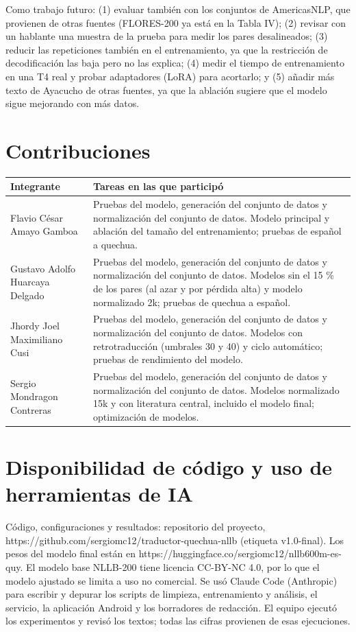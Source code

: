 \documentclass[conference]{IEEEtran}
\begin{document}
Como trabajo futuro: (1) evaluar también con los conjuntos de AmericasNLP, que provienen de otras fuentes (FLORES-200 ya está en la Tabla IV); (2) revisar con un hablante una muestra de la prueba para medir los pares desalineados; (3) reducir las repeticiones también en el entrenamiento, ya que la restricción de decodificación las baja pero no las explica; (4) medir el tiempo de entrenamiento en una T4 real y probar adaptadores (LoRA) para acortarlo; y (5) añadir más texto de Ayacucho de otras fuentes, ya que la ablación sugiere que el modelo sigue mejorando con más datos.

\section*{Contribuciones}
\begin{tabular}{@{}p{}p{}@{}}
\toprule
Integrante & Tareas en las que participó \\
\midrule
Flavio César Amayo Gamboa & Pruebas del modelo, generación del conjunto de datos y normalización del conjunto de datos. Modelo principal y ablación del tamaño del entrenamiento; pruebas de español a quechua. \\
Gustavo Adolfo Huarcaya Delgado & Pruebas del modelo, generación del conjunto de datos y normalización del conjunto de datos. Modelos sin el 15 \% de los pares (al azar y por pérdida alta) y modelo normalizado 2k; pruebas de quechua a español. \\
Jhordy Joel Maximiliano Cusi & Pruebas del modelo, generación del conjunto de datos y normalización del conjunto de datos. Modelos con retrotraducción (umbrales 30 y 40) y ciclo automático; pruebas de rendimiento del modelo. \\
Sergio Mondragon Contreras & Pruebas del modelo, generación del conjunto de datos y normalización del conjunto de datos. Modelos normalizado 15k y con literatura central, incluido el modelo final; optimización de modelos. \\
\bottomrule
\end{tabular}

\section*{Disponibilidad de código y uso de herramientas de IA}
Código, configuraciones y resultados: repositorio del proyecto, https://github.com/sergiomc12/traductor-quechua-nllb (etiqueta v1.0-final). Los pesos del modelo final están en https://huggingface.co/sergiomc12/nllb600m-es-quy. El modelo base NLLB-200 tiene licencia CC-BY-NC 4.0, por lo que el modelo ajustado se limita a uso no comercial. Se usó Claude Code (Anthropic) para escribir y depurar los scripts de limpieza, entrenamiento y análisis, el servicio, la aplicación Android y los borradores de redacción. El equipo ejecutó los experimentos y revisó los textos; todas las cifras provienen de esas ejecuciones.
\end{document}

